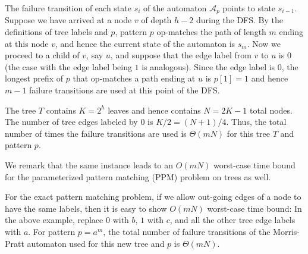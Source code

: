 \documentclass[a4paper,11pt]{article}
\begin{document}
The failure transition of each state $s_{i}$ of the automaton $\mathcal{A}_p$
points to state $s_{i-1}$.
Suppose we have arrived at a node $v$ of depth $h-2$ during the DFS.
By the definitions of tree labels and $p$,
pattern $p$ op-matches the path of length $m$ ending at this node $v$,
and hence the current state of the automaton is $s_{m}$.
Now we proceed to a child of $v$, say $u$,
and suppose that the edge label from $v$ to $u$ is $0$
(the case with the edge label being $1$ is analogous).
Since the edge label is $0$,
the longest prefix of $p$ that op-matches a path ending at $u$ is $p[1] = 1$
and hence $m-1$ failure transitions are used at this point of the DFS.

The tree $T$ contains $K = 2^h$ leaves and hence
contains $N = 2K-1$ total nodes.
The number of tree edges labeled by $0$ is $K/2 = (N+1)/4$.
Thus, the total number of times the failure transitions are used
is $\Theta(mN)$ for this tree $T$ and pattern $p$.

We remark that the same instance leads to an $O(mN)$ worst-case time
bound for the parameterized pattern matching (PPM) problem on trees as well.

For the exact pattern matching problem,
if we allow out-going edges of a node to have the same labels,
then it is easy to show $O(mN)$ worst-case time bound:
In the above example, 
replace $0$ with $b$,
$1$ with $c$, and 
all the other tree edge labels with $a$.
For pattern $p = a^m$, 
the total number of failure transitions of the Morris-Pratt automaton
used for this new tree and $p$ is $\Theta(mN)$.
\end{document}
